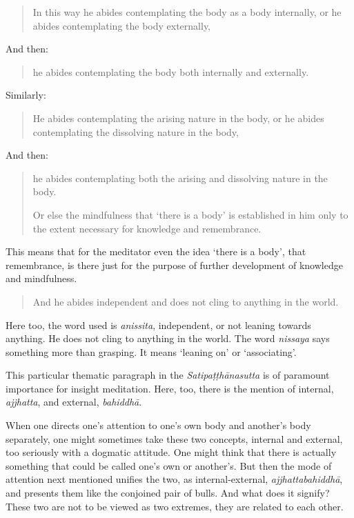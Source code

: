 \begin{quote}
In this way he abides contemplating the body as a body internally, or he abides contemplating the body externally,
\end{quote}

And then:

\begin{quote}
he abides contemplating the body both internally and externally.
\end{quote}

Similarly:

\begin{quote}
He abides contemplating the arising nature in the body, or he abides contemplating the dissolving nature in the body,
\end{quote}

And then:

\begin{quote}
he abides contemplating both the arising and dissolving nature in the body.

Or else the mindfulness that `there is a body' is established in him only to the extent necessary for knowledge and remembrance.
\end{quote}

This means that for the meditator even the idea `there is a body', that remembrance, is there just for the purpose of further development of knowledge and mindfulness.

\begin{quote}
And he abides independent and does not cling to anything in the world.
\end{quote}

Here too, the word used is \emph{anissita}, independent, or not leaning towards anything. He does not cling to anything in the world. The word \emph{nissaya} says something more than grasping. It means `leaning on' or `associating'.

This particular thematic paragraph in the \emph{Satipaṭṭhānasutta} is of paramount importance for insight meditation. Here, too, there is the mention of internal, \emph{ajjhatta}, and external, \emph{bahiddhā}.

When one directs one's attention to one's own body and another's body separately, one might sometimes take these two concepts, internal and external, too seriously with a dogmatic attitude. One might think that there is actually something that could be called one's own or another's. But then the mode of attention next mentioned unifies the two, as internal-external, \emph{ajjhattabahiddhā}, and presents them like the conjoined pair of bulls. And what does it signify? These two are not to be viewed as two extremes, they are related to each other.

